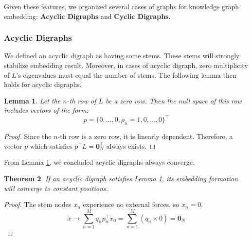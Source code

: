 \documentclass[letterpaper, 10 pt, conference]{ieeeconf}  %
\newtheorem{theorem}{Theorem}[section]
\newtheorem{lemma}[theorem]{Lemma}
\begin{document}
Given these features, we organized several cases of graphs for knowledge graph embedding: \textbf{Acyclic Digraphs} and \textbf{Cyclic Digraphs}.

\subsubsection{Acyclic Digraphs}

We defined an acyclic digraph as having some stems. These stems will strongly stabilize embedding result. Moreover, in cases of acyclic digraph, zero multiplicity of $L$'s eigenvalues must equal the number of stems. The following lemma then holds for acyclic digraphs.

\begin{lemma}\label{lemma:p}
Let the \( n \)-th row of \( L \) be a zero row. Then the null space of this row includes vectors of the form:
\begin{equation}\label{eq:DAG_left}
    p = \{0, \dots, 0, \rho_n = 1, 0, \dots, 0\}^\top
\end{equation}
\end{lemma}

\begin{proof}
Since the \( n \)-th row is a zero row, it is linearly dependent. Therefore, a vector \( p \) which satisfies \( p^\top L = \mathbf{0}_N^\top \) always exists.
\end{proof}

From Lemma \ref{lemma:p}, we concluded acyclic digraphs always converge.

\begin{theorem}\label{th:DAG_converge}
If an acyclic digraph satisfies Lemma \ref{lemma:p}, its embedding formation will converge to constant positions.
\end{theorem}

\begin{proof}
The stem nodes \( x_n \) experience no external forces, so \( \dot{x}_n = 0 \). 
\begin{equation}\label{eq:0_N}
    \dot{x} \rightarrow \sum_{n=1}^M q_n p_n^\top \dot{x}_0 = \sum_{n=1}^M (q_n \times 0) = \mathbf{0}_N
\end{equation}
\end{proof}
\end{document}
